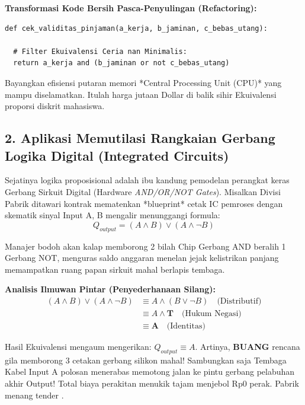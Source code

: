 \textbf{Transformasi Kode Bersih Pasca-Penyulingan (Refactoring):}
\begin{lstlisting}[style=pythonstyle]
def cek_validitas_pinjaman(a_kerja, b_jaminan, c_bebas_utang):
  
  # Filter Ekuivalensi Ceria nan Minimalis:
  return a_kerja and (b_jaminan or not c_bebas_utang)
\end{lstlisting}
Bayangkan efisiensi putaran memori *Central Processing Unit (CPU)* yang mampu diselamatkan. Itulah harga jutaan Dollar di balik sihir Ekuivalensi proporsi diskrit mahasiswa.

\subsection{2. Aplikasi Memutilasi Rangkaian Gerbang Logika Digital (Integrated Circuits)}

Sejatinya logika proposisional adalah ibu kandung pemodelan perangkat keras Gerbang Sirkuit Digital (Hardware \textit{AND/OR/NOT Gates}). Misalkan Divisi Pabrik ditawari kontrak mematenkan *blueprint* cetak IC pemroses dengan skematik sinyal Input A, B mengalir menunggangi formula: 
$$ Q_{output} = (A \land B) \lor (A \land \neg B) $$

Manajer bodoh akan kalap memborong 2 bilah Chip Gerbang AND beralih 1 Gerbang NOT, menguras saldo anggaran menelan jejak kelistrikan panjang memampatkan ruang papan sirkuit mahal berlapis tembaga.

\textbf{Analisis Ilmuwan Pintar (Penyederhanaan Silang):}
\begin{align*}
    (A \wedge B) \vee (A \wedge \neg B) &\equiv A \wedge (B \vee \neg B) \quad \text{(Distributif)} \\
    &\equiv A \wedge \mathbf{T} \quad \text{(Hukum Negasi)} \\
    &\equiv \mathbf{A} \quad \text{(Identitas)}
\end{align*}

Hasil Ekuivalensi mengaum mengerikan: $Q_{output} \equiv A$.
Artinya, \textbf{BUANG} rencana gila memborong 3 cetakan gerbang silikon mahal! Sambungkan saja Tembaga Kabel Input A polosan menerabas memotong jalan ke pintu gerbang pelabuhan akhir Output! Total biaya perakitan menukik tajam menjebol Rp0 perak. Pabrik menang tender \cite{wiki_proplogic}.
